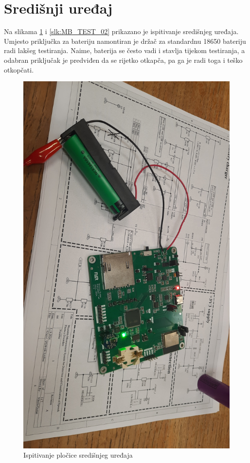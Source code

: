 \section{Središnji uređaj}
Na slikama \ref{slk:MB_TEST_01} i \ref{slk:MB_TEST_02} prikazano je ispitivanje središnjeg uređaja. Umjesto priključka za bateriju namontiran je držač za standardnu 18650 bateriju radi lakšeg testiranja. Naime, baterija se često vadi i stavlja tijekom testiranja, a odabran priključak je predviđen da se rijetko otkapča, pa ga je radi toga i teško otkopčati.
\begin{figure}[htb]
    \centering
    \includegraphics[width=10 cm]{Figures/MB_TEST_01.jpg}
    \caption{Ispitivanje pločice središnjeg uređaja}
    \label{slk:MB_TEST_01}
\end{figure}
